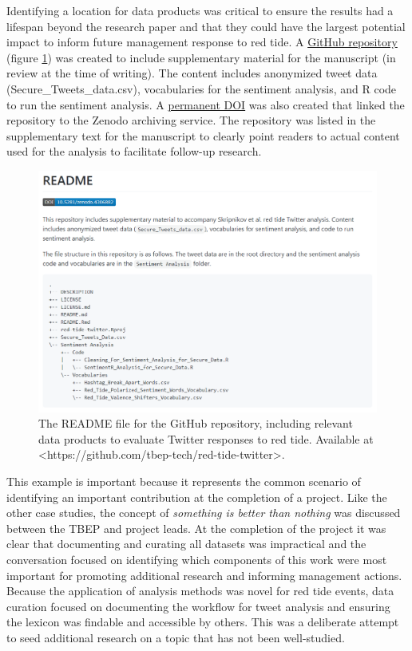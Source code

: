 \documentclass[
]{book}
\begin{document}
Identifying a location for data products was critical to ensure the results had a lifespan beyond the research paper and that they could have the largest potential impact to inform future management response to red tide. A \href{https://github.com/tbep-tech/red-tide-twitter}{GitHub repository} (figure \ref{fig:redtidereadme}) was created to include supplementary material for the manuscript (in review at the time of writing). The content includes anonymized tweet data (Secure\_Tweets\_data.csv), vocabularies for the sentiment analysis, and R code to run the sentiment analysis. A \href{https://zenodo.org/badge/latestdoi/318579178}{permanent DOI} was also created that linked the repository to the Zenodo archiving service. The repository was listed in the supplementary text for the manuscript to clearly point readers to actual content used for the analysis to facilitate follow-up research.

\begin{figure}

{\centering \includegraphics[width=1\linewidth]{img/redtidereadme} 

}

\caption{The README file for the GitHub repository, including relevant data products to evaluate Twitter responses to red tide. Available at <https://github.com/tbep-tech/red-tide-twitter>.}\label{fig:redtidereadme}
\end{figure}

This example is important because it represents the common scenario of identifying an important contribution at the completion of a project. Like the other case studies, the concept of \emph{something is better than nothing} was discussed between the TBEP and project leads. At the completion of the project it was clear that documenting and curating all datasets was impractical and the conversation focused on identifying which components of this work were most important for promoting additional research and informing management actions. Because the application of analysis methods was novel for red tide events, data curation focused on documenting the workflow for tweet analysis and ensuring the lexicon was findable and accessible by others. This was a deliberate attempt to seed additional research on a topic that has not been well-studied.
\end{document}
